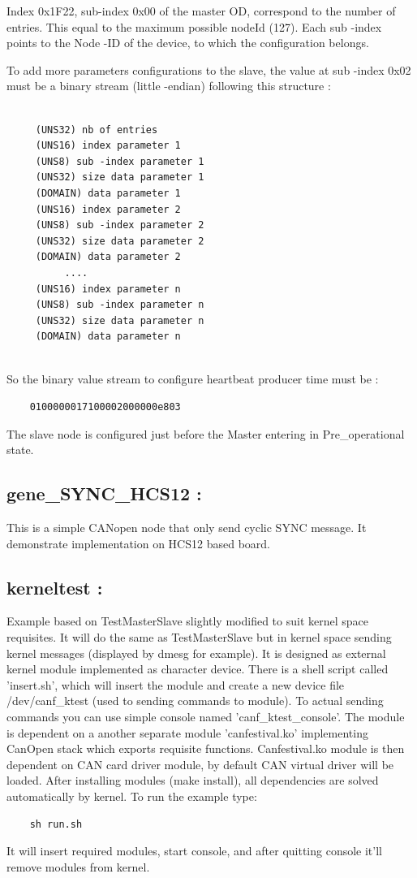 \documentclass[12pt,english,a4paper]{book}
\newcommand{\canopen}{CANopen }
\begin{document}
Index 0x1F22, sub-index 0x00 of the master OD, correspond
to the number of entries. This equal to the maximum possible nodeId
(127). Each sub -index points to the Node -ID of the device, to which
the configuration belongs.

To add more parameters configurations to the slave, the value
at sub -index 0x02 must be a binary stream (little -endian) following
this structure :


\begin{verbatim}

	 (UNS32) nb of entries
	 (UNS16) index parameter 1
	 (UNS8) sub -index parameter 1
	 (UNS32) size data parameter 1
	 (DOMAIN) data parameter 1
	 (UNS16) index parameter 2
	 (UNS8) sub -index parameter 2
	 (UNS32) size data parameter 2
	 (DOMAIN) data parameter 2
	      ....
	 (UNS16) index parameter n
	 (UNS8) sub -index parameter n
	 (UNS32) size data parameter n
	 (DOMAIN) data parameter n
	 
\end{verbatim}


So the binary value stream to configure heartbeat producer
time must be :


\begin{verbatim}
	0100000017100002000000e803
\end{verbatim}


The slave node is configured just before the Master entering
in Pre\_operational state.


\subsection{gene\_SYNC\_HCS12 :}

This is a simple \canopen node that only send cyclic SYNC message.
It demonstrate implementation on HCS12 based board.

\bigskip{}



\subsection{kerneltest :}

Example based on TestMasterSlave slightly modified to suit kernel
space requisites. It will do the same as TestMasterSlave but in kernel
space sending kernel messages (displayed by dmesg for example). It
is designed as external kernel module implemented as character device.
There is a shell script called 'insert.sh', which will insert the
module and create a new device file /dev/canf\_ktest (used to sending
commands to module). To actual sending commands you can use simple
console named 'canf\_ktest\_console'. The module is dependent on a
another separate module 'canfestival.ko' implementing CanOpen stack
which exports requisite functions. Canfestival.ko module is then dependent
on CAN card driver module, by default CAN virtual driver will be loaded.
After installing modules (make install), all dependencies are solved
automatically by kernel. To run the example type: 
\begin{verbatim}
	sh run.sh
\end{verbatim}
It will insert required modules, start console, and after quitting
console it'll remove modules from kernel.
\end{document}
